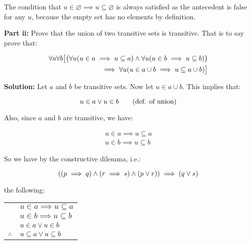 \documentclass{article}
\begin{document}
The condition that $u\in \varnothing\implies u\subseteq \varnothing$ is always satisfied as the antecedent is false for any $u$, because the empty set has no elements by definition.
\bigskip

\noindent\textbf{Part ii:} Prove that the union of two transitive sets is transitive. That is to say prove that:

\begin{align*}
    \forall a\forall b\big[\big(\forall u(u\in a\implies u\subseteq a)\wedge\forall u(u\in b\implies u\subseteq b)\big)\\
    \implies\forall u(u\in a\cup b\implies u\subseteq a\cup b)\big]
\end{align*}

\noindent\textbf{Solution:} Let $a$ and $b$ be transitive sets. Now let $u\in a\cup b$. This implies that:

\begin{equation}
    u\in a \vee u\in b\tag{def. of union}
\end{equation}

Also, since $a$ and $b$ are transitive, we have:

\begin{gather*}
    u\in a\implies u\subseteq a\tag{def. of transitive}\\
    u\in b\implies u\subseteq b\tag{def. of transitive}
\end{gather*}

So we have by the constructive dilemma, i.e.:

$$((p\implies q)\wedge(r\implies s)\wedge(p\vee r))\implies (q\vee s)$$

the following:

\begin{center}
\begin{tabular}{c@{\,}l@{}} 
    & $u\in a\implies u\subseteq a$ \\
    & $u\in b\implies u\subseteq b$ \\
    & $u\in a \vee u\in b$ \\
    \cline{2-2}
$\therefore$         & $u\subseteq a\vee u\subseteq b$ \\
\end{tabular}
\end{center}

\end{document}

